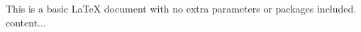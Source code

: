 \documentclass{article}
\begin{document}
	This is a basic LaTeX document with
	no
	extra parameters or packages included.
	content...
\end{document}
